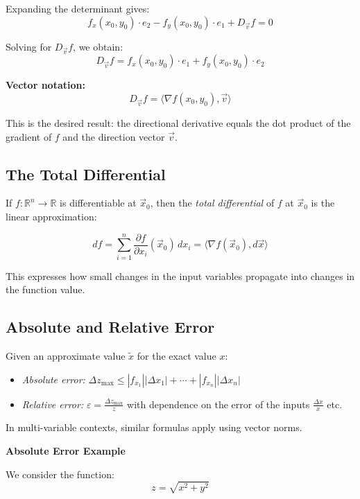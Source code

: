Expanding the determinant gives:
\[
f_x(x_0, y_0) \cdot e_2 - f_y(x_0, y_0) \cdot e_1 + D_{\vec{v}}f = 0
\]

Solving for \( D_{\vec{v}}f \), we obtain:
\[
D_{\vec{v}}f = f_x(x_0, y_0) \cdot e_1 + f_y(x_0, y_0) \cdot e_2
\]

\textbf{Vector notation:}
\[
D_{\vec{v}}f = \langle \nabla f(x_0, y_0), \vec{v} \rangle
\]

This is the desired result: the directional derivative equals the dot product of the gradient of \( f \) and the direction vector \( \vec{v} \).

\subsection{The Total Differential}

If \( f : \mathbb{R}^n \to \mathbb{R} \) is differentiable at \( \vec{x}_0 \), then the 
\emph{total differential} of \( f \) at \( \vec{x}_0 \) is the linear approximation:

\[
df = \sum_{i=1}^n \frac{\partial f}{\partial x_i}(\vec{x}_0) \, dx_i = \langle \nabla f(\vec{x}_0), d\vec{x} \rangle
\]

This expresses how small changes in the input variables propagate into changes in the function value.


\subsection{Absolute and Relative Error}

Given an approximate value \( \tilde{x} \) for the exact value \( x \):

\begin{itemize}[label=\(-\)]
\item \emph{Absolute error:} \(\Delta z_{\max} \le |f_{x_1}||\Delta x_1| + \cdots + |f_{x_n}||\Delta x_n| \)
\item \emph{Relative error:} \( \varepsilon = \frac{\Delta z_{\max}}{z}\) with dependence on the error of the inputs \(\frac{\Delta x}{x}\) etc.
\end{itemize}

In multi-variable contexts, similar formulas apply using vector norms.
\vspace{\baselineskip}

\textbf{Absolute Error Example}
\vspace{\baselineskip}

We consider the function:
\[
z = \sqrt{x^2 + y^2}
\]

